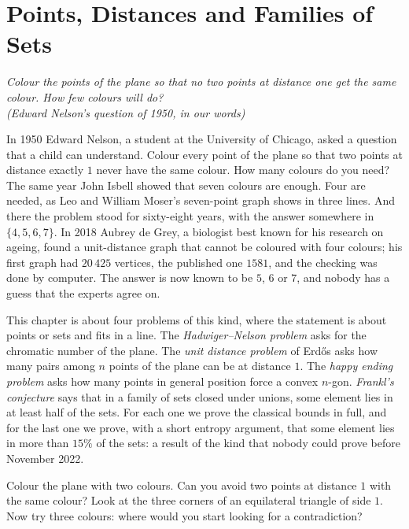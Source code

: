 \chapter{Points, Distances and Families of Sets}\label{ch:geometric}

\begin{center}\itshape
Colour the points of the plane so that no two points at distance one get the same colour. How few colours will do?\\
\upshape(Edward Nelson's question of 1950, in our words)
\end{center}

In 1950 Edward Nelson, a student at the University of Chicago, asked a question that a child can understand. Colour every point of the plane so that
two points at distance exactly $1$ never have the same colour. How many colours do you need? The same year John Isbell showed that seven colours are
enough. Four are needed, as Leo and William Moser's seven-point graph shows in three lines. And there the problem stood for sixty-eight years, with the
answer somewhere in $\{4,5,6,7\}$. In 2018 Aubrey de Grey, a biologist best known for his research on ageing, found a unit-distance graph that cannot be
coloured with four colours; his first graph had $20\,425$ vertices, the published one $1581$, and the checking was done by computer. The answer is now
known to be $5$, $6$ or $7$, and nobody has a guess that the experts agree on.

This chapter is about four problems of this kind, where the statement is about points or sets and fits in a line. The \emph{Hadwiger--Nelson problem}
asks for the chromatic number of the plane. The \emph{unit distance problem} of Erd\H os asks how many pairs among $n$ points of the plane can be at
distance $1$. The \emph{happy ending problem} asks how many points in general position force a convex $n$-gon. \emph{Frankl's conjecture} says that in a
family of sets closed under unions, some element lies in at least half of the sets. For each one we prove the classical bounds in full, and for the last
one we prove, with a short entropy argument, that some element lies in more than $15\%$ of the sets: a result of the kind that nobody could prove before
November 2022.

\begin{think}
Colour the plane with two colours. Can you avoid two points at distance $1$ with the same colour? Look at the three corners of an equilateral triangle
of side $1$. Now try three colours: where would you start looking for a contradiction?
\end{think}

